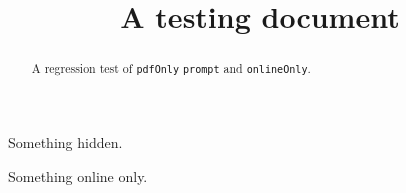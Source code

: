 \documentclass{ximera}
\title{A testing document}
\begin{document}
\begin{abstract}
  A regression test of \texttt{pdfOnly} \texttt{prompt} and
  \texttt{onlineOnly}.
\end{abstract}
\maketitle


\begin{prompt}  
  Something hidden.
\end{prompt}
\begin{onlineOnly}
  Something online only.
\end{onlineOnly}
\end{document}
